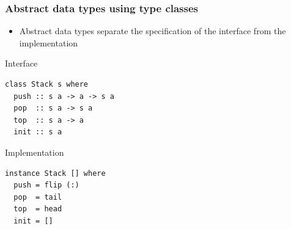\documentclass{beamer}
\begin{document}
\begin{frame}[fragile]
  \frametitle{Abstract data types using type classes}
  \begin{itemize}
  \item Abstract data types separate the specification of the
    interface from the implementation
  \end{itemize}
  \begin{block}{Interface}
\begin{lstlisting}
class Stack s where
  push :: s a -> a -> s a
  pop  :: s a -> s a
  top  :: s a -> a
  init :: s a
\end{lstlisting}
  \end{block}
  \begin{block}{Implementation}
\begin{lstlisting}
instance Stack [] where
  push = flip (:)
  pop  = tail
  top  = head
  init = []
\end{lstlisting}
  \end{block}
\end{frame}
\end{document}
